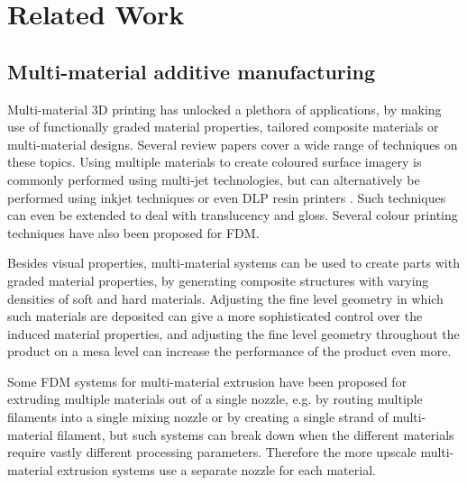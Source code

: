 \section{Related Work}

\subsection{Multi-material additive manufacturing}
Multi-material 3D printing has unlocked a plethora of applications, by making use of functionally graded material properties, tailored composite materials or multi-material designs.
Several review papers cover a wide range of techniques on these topics.\cite{Vaezi2013,Rafiee2020}
Using multiple materials to create coloured surface imagery is commonly performed using multi-jet technologies, but can alternatively be performed using inkjet techniques\cite{sachs1994three} or even DLP resin printers \cite{Zhou2011Development}.
Such techniques can even be extended to deal with translucency\cite{Brunton2018} and gloss\cite{elkhuizen2019gloss}.
Several colour printing techniques have also been proposed for FDM.\cite{reiner2014dual,Song2019,Kuipers2018}

Besides visual properties, multi-material systems can be used to create parts with graded material properties, by generating composite structures with varying densities of soft and hard materials.\cite{Cho2003851}
Adjusting the fine level geometry in which such materials are deposited can give a more sophisticated control over the induced material properties,\cite{Leung2019,mirzaali2020}
and adjusting the fine level geometry throughout the product on a mesa level can increase the performance of the product even more.\cite{Zhu2017}

Some FDM systems for multi-material extrusion have been proposed for extruding multiple materials out of a single nozzle, e.g. by routing multiple filaments into a single mixing nozzle\cite{diamondhotend} or by creating a single strand of multi-material filament\cite{Takahashi2020,Mosaic2015},
but such systems can break down when the different materials require vastly different processing parameters.
Therefore the more upscale multi-material extrusion systems use a separate nozzle for each material.\cite{UltimakerS5}



